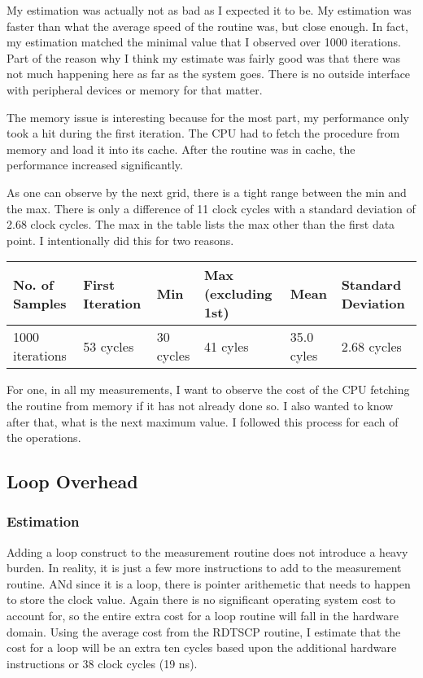 \documentclass[paper=a4, fontsize=11pt]{scrartcl}
\numberwithin{equation}{section}        %
\numberwithin{figure}{section}          %
\numberwithin{table}{section}               %
\begin{document}
My estimation was actually not as bad as I expected it to be.  My estimation was faster than what the average speed of the routine was, but close enough.  In fact, my estimation matched the minimal value that I observed over 1000 iterations.  Part of the reason why I think my estimate was fairly good was that there was not much happening here as far as the system goes.  There is no outside interface with peripheral devices or memory for that matter.

The memory issue is interesting because for the most part, my performance only took a hit during the first iteration.  The CPU had to fetch the procedure from memory and load it into its cache.  After the routine was in cache, the performance increased significantly.

As one can observe by the next grid, there is a tight range between the min and the max.  There is only a difference of 11 clock cycles with a standard deviation of 2.68 clock cycles.  The max in the table lists the max other than the first data point.  I intentionally did this for two reasons.

\begin{center}
    \begin{tabular}{ | l | l | l | l | l | l |}
    \hline
    No. of Samples & First Iteration & Min & Max (excluding 1st) & Mean & Standard Deviation \\ \hline
    1000 iterations & 53 cycles & 30 cycles & 41 cyles & 35.0 cyles & 2.68 cycles \\ 
    \hline
    \end{tabular}
\end{center}

For one, in all my measurements, I want to observe the cost of the CPU fetching the routine from memory if it has not already done so.  I also wanted to know after that, what is the next maximum value.  I followed this process for each of the operations.

\subsection{Loop Overhead}

\subsubsection{Estimation}

Adding a loop construct to the measurement routine does not introduce a heavy burden.  In reality, it is just a few more instructions to add to the measurement routine.  ANd since it is a loop, there is pointer arithemetic that needs to happen to store the clock value.  Again there is no significant operating system cost to account for, so the entire extra cost for a loop routine will fall in the hardware domain.  Using the average cost from the RDTSCP routine, I estimate that the cost for a loop will be an extra ten cycles based upon the additional hardware instructions or 38 clock cycles (19 ns).
\end{document}

